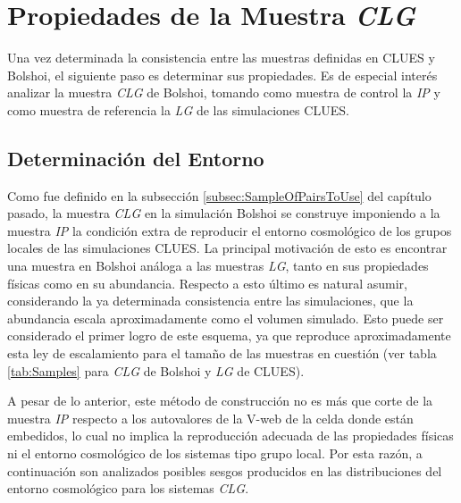 



\section{Propiedades de la Muestra \textit{CLG}}
\label{sec:PropertiesOfSamplePairs}


Una vez determinada la consistencia entre las muestras definidas en CLUES
y Bolshoi, el siguiente paso es determinar sus propiedades. Es de especial
interés analizar la muestra \textit{CLG} de Bolshoi, tomando como muestra 
de control la \textit{IP} y como muestra de referencia la \textit{LG} de 
las simulaciones CLUES.


	\subsection{Determinación del Entorno}
	\label{subsec:DeterminationOfTheirHostEnvironment}

Como fue definido en la subsección \ref{subsec:SampleOfPairsToUse} del 
capítulo pasado, la muestra \textit{CLG} en la simulación Bolshoi se 
construye imponiendo a la muestra \textit{IP} la condición extra de 
reproducir el entorno cosmológico de los grupos locales de las simulaciones 
CLUES. La principal motivación de esto es encontrar una muestra en Bolshoi 
análoga a las muestras \textit{LG}, tanto en sus propiedades físicas 
como en su abundancia. Respecto a esto último es natural asumir, 
considerando la ya determinada consistencia entre las simulaciones, que la 
abundancia escala aproximadamente como el volumen simulado. Esto puede 
ser considerado el primer logro de este esquema, ya que reproduce 
aproximadamente esta ley de escalamiento para el tamaño de las muestras 
en cuestión (ver tabla \ref{tab:Samples} para \textit{CLG} de Bolshoi y
\textit{LG} de CLUES).


A pesar de lo anterior, este método de construcción no es más que corte
de la muestra \textit{IP} respecto a los autovalores de la V-web de la 
celda donde están embedidos, lo cual no implica la reproducción 
adecuada de las propiedades físicas ni el entorno cosmológico de los 
sistemas tipo grupo local. Por esta razón, a conti\-nuación son analizados
posibles sesgos producidos en las distribuciones del entorno cosmológico
para los sistemas \textit{CLG}.

